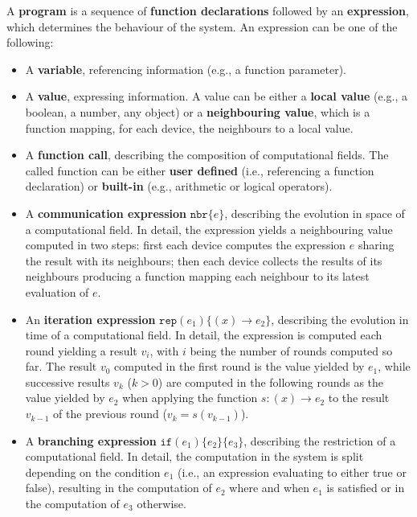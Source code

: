 A \textbf{program} is a sequence of \textbf{function declarations} followed by
an \textbf{expression}, which determines the behaviour of the system. An
expression can be one of the following:
\begin{itemize}
  \item A \textbf{variable}, referencing information (e.g., a function
        parameter).
  \item A \textbf{value}, expressing information. A value can be either a
        \textbf{local value} (e.g., a boolean, a number, any object) or a
        \textbf{neighbouring value}, which is a function mapping, for each
        device, the neighbours to a local value.
  \item A \textbf{function call}, describing the composition of computational
        fields. The called function can be either \textbf{user defined} (i.e.,
        referencing a function declaration) or \textbf{built-in} (e.g.,
        arithmetic or logical operators).
  \item A \textbf{communication expression} $\texttt{nbr}\{e\}$, describing the
        evolution in space of a computational field. In detail, the expression
        yields a neighbouring value computed in two steps: first each device
        computes the expression $e$ sharing the result with its neighbours;
        then each device collects the results of its neighbours producing a
        function mapping each neighbour to its latest evaluation of $e$.

        

  \item An \textbf{iteration expression} $\texttt{rep}(e_1)\{(x) \rightarrow
        e_2 \}$, describing the evolution in time of a computational field. In
        detail, the expression is computed each round yielding a result $v_i$,
        with $i$ being the number of rounds computed so far. The result $v_0$
        computed in the first round is the value yielded by $e_1$, while
        successive results $v_k$ ($k > 0$) are computed in the following rounds
        as the value yielded by $e_2$ when applying the function $s: (x)
        \rightarrow e_2$ to the result $v_{k-1}$ of the previous round ($v_k =
        s(v_{k-1})$).
  \item A \textbf{branching expression} $\texttt{if}(e_1)\{e_2\}\{e_3\}$,
        describing the restriction of a computational field. In detail, the
        computation in the system is split depending on the condition $e_1$
        (i.e., an expression evaluating to either true or false), resulting in
        the computation of ${e_2}$ where and when $e_1$ is satisfied or in the
        computation of $e_3$ otherwise.


\end{itemize}
